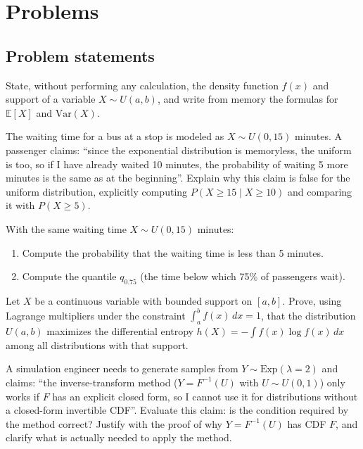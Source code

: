 \section*{Problems}

\subsection*{Problem statements}

\begin{problema}
	\label{prob:97c4388}
	State, without performing any calculation, the density function $f(x)$ and support of a variable $X \sim U(a,b)$, and write from memory the formulas for $\mathbb{E}[X]$ and $\text{Var}(X)$.
\end{problema}

\begin{problema}
	\label{prob:9f6e77c}
	The waiting time for a bus at a stop is modeled as $X \sim U(0, 15)$ minutes. A passenger claims: ``since the exponential distribution is memoryless, the uniform is too, so if I have already waited 10 minutes, the probability of waiting 5 more minutes is the same as at the beginning''. Explain why this claim is false for the uniform distribution, explicitly computing $P(X \ge 15 \mid X \ge 10)$ and comparing it with $P(X \ge 5)$.
\end{problema}

\begin{problema}
	\label{prob:8fcc221}
	With the same waiting time $X \sim U(0, 15)$ minutes:
	\begin{enumerate}
		\item Compute the probability that the waiting time is less than 5 minutes.
		\item Compute the quantile $q_{0.75}$ (the time below which 75\% of passengers wait).
	\end{enumerate}
\end{problema}

\begin{problema}
	\label{prob:5794e09}
	Let $X$ be a continuous variable with bounded support on $[a,b]$. Prove, using Lagrange multipliers under the constraint $\int_a^b f(x)\,dx=1$, that the distribution $U(a,b)$ maximizes the differential entropy $h(X) = -\int f(x)\log f(x)\,dx$ among all distributions with that support.
\end{problema}

\begin{problema}
	\label{prob:126be41}
	A simulation engineer needs to generate samples from $Y \sim \text{Exp}(\lambda=2)$ and claims: ``the inverse-transform method ($Y = F^{-1}(U)$ with $U \sim U(0,1)$) only works if $F$ has an explicit closed form, so I cannot use it for distributions without a closed-form invertible CDF''. Evaluate this claim: is the condition required by the method correct? Justify with the proof of why $Y=F^{-1}(U)$ has CDF $F$, and clarify what is actually needed to apply the method.
\end{problema}

